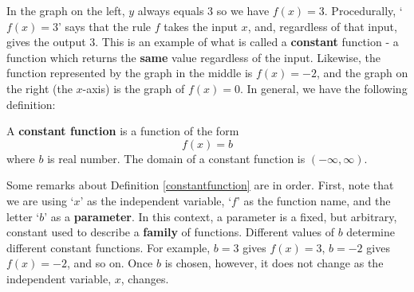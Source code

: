 \documentclass{ximera}
\begin{document}
\begin{center}
\end{center}

In the graph on the left, $y$ always equals $3$ so we have $f(x) = 3$.  Procedurally, `$f(x) = 3$' says that the rule $f$ takes the input $x$, and, regardless of that input, gives the output $3$.  This is an example of what is called a \textbf{constant} function - a function which returns the \textbf{same} value regardless of the input.  Likewise, the function represented by the graph in the middle is $f(x) = -2$, and the graph on the right (the $x$-axis) is the graph of $f(x) = 0$.  In general, we have the following definition:

\begin{definition} \label{constantfunction} A \textbf{constant function} is a function of the form \[ f(x) =  b\] where $b$ is real number.  The domain of a constant function is $(-\infty, \infty)$.
\end{definition}

Some remarks about  Definition \ref{constantfunction} are in order.   First, note that we are using `$x$' as the independent variable, `$f$' as the function name, and  the letter `$b$' as a  \textbf{parameter}.  In this context, a parameter is a fixed, but arbitrary, constant used to describe a \textbf{family} of functions.  Different values of $b$ determine different constant functions.  For example, $b = 3$ gives $f(x) = 3$, $b = -2$ gives $f(x) = -2$, and so on.  Once $b$ is chosen, however, it does not change as the independent variable, $x$, changes.   
\end{document}
